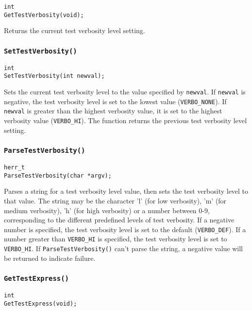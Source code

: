 \documentclass[../HDF5_RFC.tex]{subfiles}
\begin{document}
\begin{verbatim}
int
GetTestVerbosity(void);
\end{verbatim}

Returns the current test verbosity level setting.

\subsubsection{\texttt{SetTestVerbosity()}}

\begin{verbatim}
int
SetTestVerbosity(int newval);
\end{verbatim}

Sets the current test verbosity level to the value specified by \texttt{newval}. If \texttt{newval} is negative, the test verbosity level is set to the lowest value (\texttt{VERBO\_NONE}). If \texttt{newval}
is greater than the highest verbosity value, it is set to the highest verbosity value (\texttt{VERBO\_HI}). The function returns the previous test verbosity level setting.

\subsubsection{\texttt{ParseTestVerbosity()}}

\begin{verbatim}
herr_t
ParseTestVerbosity(char *argv);
\end{verbatim}

Parses a string for a test verbosity level value, then sets the test verbosity level to that value.
The string may be the character 'l' (for low verbosity), 'm' (for medium verbosity), 'h' (for high verbosity)
or a number between 0-9, corresponding to the different predefined levels of test verbosity. If a negative
number is specified, the test verbosity level is set to the default (\texttt{VERBO\_DEF}). If a number
greater than \texttt{VERBO\_HI} is specified, the test verbosity level is set to \texttt{VERBO\_HI}. If \texttt{ParseTestVerbosity()} can't parse the string, a negative value will be returned to indicate
failure.

\subsubsection{\texttt{GetTestExpress()}}
\label{apdx:testframe_gettestexpress}

\begin{verbatim}
int
GetTestExpress(void);
\end{verbatim}
\end{document}
